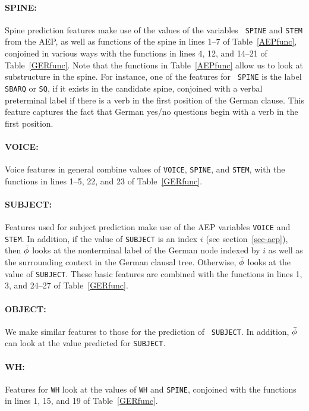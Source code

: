 \documentclass[11pt]{report}
\theoremstyle{plain}
\begin{document}
{\paragraph{SPINE:} 
Spine prediction features make use of the values of the variables {\tt
SPINE} and {\tt STEM} from the AEP, as well as functions of the spine
in lines 1--7 of Table~\ref{AEPfunc}, conjoined in various ways with
the functions in lines 4, 12, and 14--21 of Table~\ref{GERfunc}. Note
that the functions in Table~\ref{AEPfunc} allow us to look at
substructure in the spine. For instance, one of the features for {\tt
SPINE} is the label {\tt SBARQ} or {\tt SQ}, if it exists in the
candidate spine, conjoined with a verbal preterminal label if there is
a verb in the first position of the German clause. This feature
captures the fact that German yes/no questions begin with a verb in
the first position.

\paragraph{VOICE:} 
Voice features in general combine values of {\tt VOICE}, {\tt SPINE},
and {\tt STEM}, with the functions in lines 1--5, 22, and 23 of
Table~\ref{GERfunc}.

\paragraph{SUBJECT:} 
Features used for subject prediction make use of the AEP variables
{\tt VOICE} and {\tt STEM}. In addition, if the value of {\tt SUBJECT}
is an index $i$ (see section~\ref{sec-aep}), then $\bar{\phi}$ looks at the
nonterminal label of the German node indexed by $i$ as well as the
surrounding context in the German clausal tree. Otherwise, $\bar{\phi}$
looks at the value of {\tt SUBJECT}. These basic features are combined
with the functions in lines 1, 3, and 24--27 of Table~\ref{GERfunc}.

\paragraph{OBJECT:} 
We make similar features to those for the prediction of {\tt
SUBJECT}. In addition, $\bar{\phi}$ can look at the value predicted for
{\tt SUBJECT}.

\paragraph{WH:} 
Features for {\tt WH} look at the values of {\tt WH} and {\tt SPINE},
conjoined with the functions in lines 1, 15, and 19 of
Table~\ref{GERfunc}.

}
\end{document}
